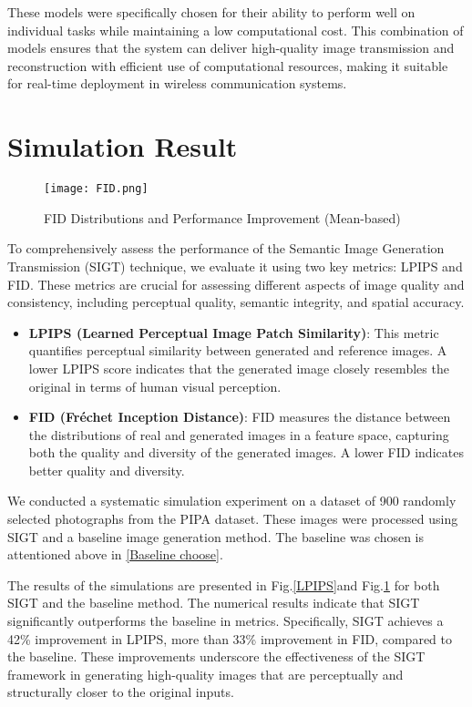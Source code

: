 \documentclass[conference]{IEEEtran}
\begin{document}
These models were specifically chosen for their ability to perform well on individual tasks while maintaining a low computational cost. This combination of models ensures that the system can deliver high-quality image transmission and reconstruction with efficient use of computational resources, making it suitable for real-time deployment in wireless communication systems.




\section{Simulation Result}

\begin{figure}[!t]
    \centering
    {\texttt{[image: FID.png]}}
    \caption{FID Distributions and Performance Improvement (Mean-based)}
    \label{FID}
\end{figure}

To comprehensively assess the performance of the Semantic Image Generation Transmission (SIGT) technique, we evaluate it using two key metrics: LPIPS and  FID. These metrics are crucial for assessing different aspects of image quality and consistency, including perceptual quality, semantic integrity, and spatial accuracy.

\begin{itemize}
    \item \textbf{LPIPS (Learned Perceptual Image Patch Similarity)}: This metric quantifies perceptual similarity between generated and reference images. A lower LPIPS score indicates that the generated image closely resembles the original in terms of human visual perception.
    \item \textbf{FID (Fréchet Inception Distance)}: FID measures the distance between the distributions of real and generated images in a feature space, capturing both the quality and diversity of the generated images. A lower FID indicates better quality and diversity.
    
\end{itemize}

We conducted a systematic simulation experiment on a dataset of 900 randomly selected photographs from the PIPA dataset. These images were processed using SIGT and a baseline image generation method. The baseline was chosen is attentioned above in \ref{Baseline choose}.

The results of the simulations are presented in Fig.\ref{LPIPS}and Fig.\ref{FID} for both SIGT and the baseline method. The numerical results indicate that SIGT significantly outperforms the baseline in  metrics. Specifically, SIGT achieves a 42\% improvement in LPIPS, more than 33\% improvement in FID, compared to the baseline. These improvements underscore the effectiveness of the SIGT framework in generating high-quality images that are perceptually and structurally closer to the original inputs.
\end{document}
